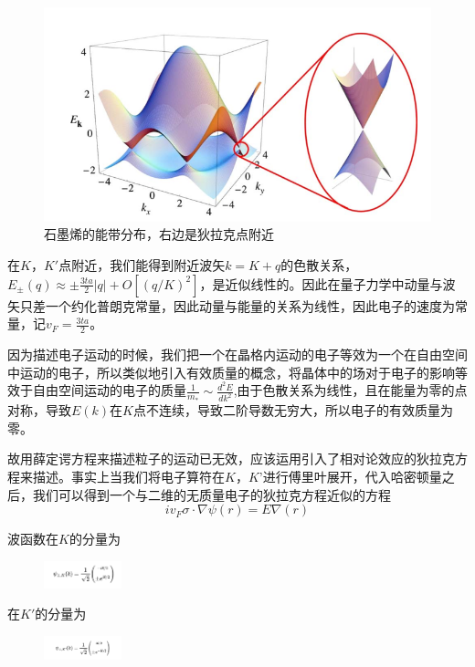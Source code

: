 \begin{figure}[H]
    \centering
    \includegraphics{img/石墨烯的能带分布，右边是狄拉克点附近.png}
    \caption{石墨烯的能带分布，右边是狄拉克点附近}
    \label{fig:my_label}
\end{figure}
在$K$，$K'$点附近，我们能得到附近波矢$k=K+q$的色散关系，$E_{\pm } (q)\approx \pm \frac{3ta}{2} \left | q \right | + O\left [(q/K)^{2}  \right ]$，是近似线性的。因此在量子力学中动量与波矢只差一个约化普朗克常量，因此动量与能量的关系为线性，因此电子的速度为常量，记$v_F=\frac{3ta}{2}$。\par
因为描述电子运动的时候，我们把一个在晶格内运动的电子等效为一个在自由空间中运动的电子，所以类似地引入有效质量的概念，将晶体中的场对于电子的影响等效于自由空间运动的电子的质量$\frac{1}{m_*}\sim \frac{d^{2}E}{dk^2}$,由于色散关系为线性，且在能量为零的点对称，导致$E(k)$在$K$点不连续，导致二阶导数无穷大，所以电子的有效质量为零。\par
故用薛定谔方程来描述粒子的运动已无效，应该运用引入了相对论效应的狄拉克方程来描述。事实上当我们将电子算符在$K$，$K’$进行傅里叶展开，代入哈密顿量之后，我们可以得到一个与二维的无质量电子的狄拉克方程近似的方程
\begin{equation}\label{...}
    iv_{F}\sigma \cdot \nabla \psi(r)=E \nabla (r)
\end{equation}
\par
波函数在$K$的分量为

\begin{figure}[H]
    \centering
    \includegraphics[width=0.20\textwidth]{img/EQ1.png}
\end{figure}
在$K'$的分量为
\begin{figure}[H]
    \centering
    \includegraphics[width=0.20\textwidth]{img/EQ2.png}

\end{figure}
\par

